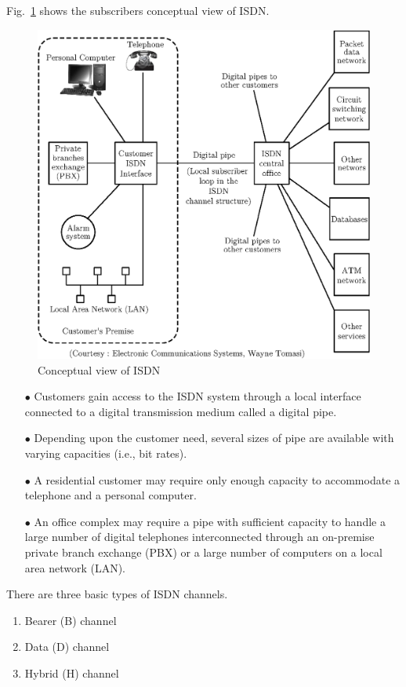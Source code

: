Fig.~\ref{fig10.6} shows the subscribers conceptual view of ISDN.
\begin{figure}[H]
\centering
\includegraphics[scale=.8]{chap10/fig10.6.eps}
\caption{Conceptual view of ISDN}\label{fig10.6}
\end{figure}
\begin{itemize}
\item[$\bullet$] Customers gain access to the ISDN system through a local interface connected to a digital transmission medium called a digital pipe.

\item[$\bullet$] Depending upon the customer need, several sizes of pipe are available with varying capacities (i.e., bit rates).

\item[$\bullet$] A residential customer may require only enough capacity to accommodate a telephone and a personal computer.

\item[$\bullet$] An office complex may require a pipe with sufficient capacity to handle a large number of digital telephones interconnected through an on-premise private branch exchange (PBX) or a large number of computers on a local area network (LAN).
\end{itemize}
There are three basic types of ISDN channels.
\begin{enumerate}
\item Bearer (B) channel

\item Data (D) channel

\item Hybrid (H) channel
\end{enumerate}

